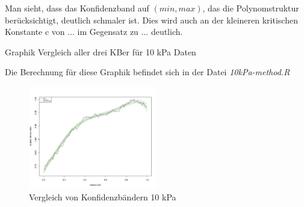 \documentclass[12pt,a4paper]{article}
\theoremstyle{definition}
\theoremstyle{definition}
\theoremstyle{definition}
\begin{document}
Man sieht, dass  das Konfidenzband auf $(min,max)$, das die Polynomstruktur berücksichtigt, deutlich schmaler ist. Dies wird auch an der kleineren kritischen Konstante c von ... im Gegensatz zu ... deutlich.

Graphik Vergleich aller drei KBer für 10 kPa Daten

Die Berechnung für diese Graphik befindet sich in der Datei \textit{10kPa-method.R}

\begin{figure}[H] 
  \centering
     \includegraphics[width=0.5\textwidth]{10kPa-method.pdf}
  \caption{Vergleich von Konfidenzbändern 10 kPa}
  \label{fig:4}
\end{figure}



%
%
%
%
%
%
%
%
%
\end{document}
